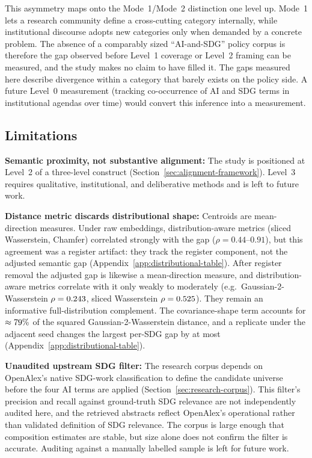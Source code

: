 \documentclass[12pt,a4paper]{article}
\begin{document}
  This asymmetry maps onto the Mode~1/Mode~2 distinction \parencite{Gibbons1994} one level up. Mode~1 lets a research community define a cross-cutting category internally, while institutional discourse adopts new categories only when demanded by a concrete problem. The absence of a comparably sized ``AI-and-SDG'' policy corpus is therefore the gap observed before Level~1 coverage or Level~2 framing can be measured, and the study makes no claim to have filled it. The gaps measured here describe divergence within a category that barely exists on the policy side. A future Level~0 measurement (tracking co-occurrence of AI and SDG terms in institutional agendas over time) would convert this inference into a measurement.

\subsection{Limitations}
\label{sec:limitations}

\textbf{Semantic proximity, not substantive alignment:} The study is positioned at Level~2 of a three-level construct (Section~\ref{sec:alignment-framework}). Level~3 requires qualitative, institutional, and deliberative methods and is left to future work.

\textbf{Distance metric discards distributional shape:} Centroids are mean-direction measures. Under raw embeddings, distribution-aware metrics (sliced Wasserstein, Chamfer) correlated strongly with the gap ($\rho = 0.44$--$0.91$), but this agreement was a register artifact: they track the register component, not the adjusted semantic gap (Appendix~\ref{app:distributional-table}). After register removal the adjusted gap is likewise a mean-direction measure, and distribution-aware metrics correlate with it only weakly to moderately (e.g.\ Gaussian-2-Wasserstein $\rho=0.243$, sliced Wasserstein $\rho=0.525$). They remain an informative full-distribution complement. The covariance-shape term accounts for $\approx79\%$ of the squared Gaussian-2-Wasserstein distance, and a replicate under the adjacent seed changes the largest per-SDG gap by at most \DistGapMaxSeedDelta{} (Appendix~\ref{app:distributional-table}).

\textbf{Unaudited upstream SDG filter:} The research corpus depends on OpenAlex's native SDG-work classification to define the candidate universe before the four AI terms are applied (Section~\ref{sec:research-corpus}). This filter's precision and recall against ground-truth SDG relevance are not independently audited here, and the \NResearchAbstracts{} retrieved abstracts reflect OpenAlex's operational rather than validated definition of SDG relevance. The corpus is large enough that composition estimates are stable, but size alone does not confirm the filter is accurate. Auditing against a manually labelled sample is left for future work.
\end{document}
